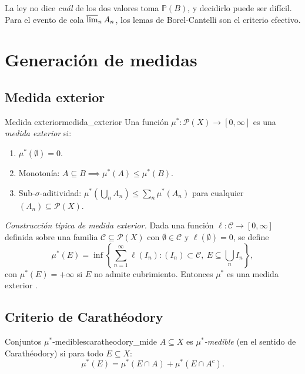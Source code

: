 \documentclass[11pt, a4paper]{article}
\begin{document}
\obs La ley no dice \emph{cuál} de los dos valores toma $\mathbb{P}(B)$, y decidirlo puede ser
difícil. Para el evento de cola $\varlimsup_n A_n$, los lemas de Borel-Cantelli son el
criterio efectivo.

\newpage

\section{Generación de medidas}

\subsection{Medida exterior}

\begin{definicion}{Medida exterior}{medida_exterior}
Una función $\mu^*: \mathcal{P}(X) \to [0, \infty]$ es una \emph{medida exterior} si:
\begin{enumerate}
    \item $\mu^*(\emptyset) = 0$.
    \item Monotonía: $A \subseteq B \implies \mu^*(A) \le \mu^*(B)$.
    \item Sub-$\sigma$-aditividad: $\mu^*(\bigcup_n A_n) \le \sum_n \mu^*(A_n)$ para cualquier
    $(A_n) \subseteq \mathcal{P}(X)$.
\end{enumerate}
\end{definicion}

\obs \emph{Construcción típica de medida exterior.} Dada una función $\ell:
\mathcal{C} \to [0, \infty]$ definida sobre una familia $\mathcal{C} \subseteq \mathcal{P}(X)$
con $\emptyset \in \mathcal{C}$ y $\ell(\emptyset) = 0$, se define
$$ \mu^*(E) = \inf\left\{ \sum_{n=1}^\infty \ell(I_n) : (I_n) \subset \mathcal{C}, \ E \subseteq
\bigcup_n I_n \right\}, $$
con $\mu^*(E) = +\infty$ si $E$ no admite cubrimiento. Entonces $\mu^*$ es una medida exterior
.

\subsection{Criterio de Carathéodory}

\begin{definicion}{Conjuntos $\mu^*$-medibles}{caratheodory_mide}
$A \subseteq X$ es \emph{$\mu^*$-medible} (en el sentido de Carathéodory) si para todo
$E \subseteq X$:
$$ \mu^*(E) = \mu^*(E \cap A) + \mu^*(E \cap A^c). $$
\end{definicion}
\end{document}

